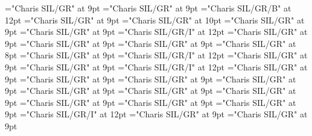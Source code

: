 \documentclass[gps1,twoside]{article}
\begin{document}
\font\spanspansensecontentspansensessensesensesentrybefore="Charis SIL/GR" at 9pt
\font\sensessensesensesentryafter="Charis SIL/GR" at 9pt
\font\sensenumbersensecontentsensessensesensesentry="Charis SIL/GR/B" at 12pt
\font\sensenumbersensecontentsensessensesensesentryafter="Charis SIL/GR" at 9pt
\font\sensesensessensesensesentry="Charis SIL/GR" at 10pt
\font\sensetypesensesensessensesensesentrybefore="Charis SIL/GR" at 9pt
\font\sensetypesensesensessensesensesentryafter="Charis SIL/GR" at 9pt
\font\sensetypesensesensessensesensesentry="Charis SIL/GR/I" at 12pt
\font\spanspanabbreviationsensetypesensesensessensesensesentrybefore="Charis SIL/GR" at 9pt
\font\spanspandefinitionorglosssensesensessensesensesentrybefore="Charis SIL/GR" at 9pt
\font\spandefinitionorglosssensesensessensesensesentrylastchildafter="Charis SIL/GR" at 9pt
\font\exampleexampleexamplessensesensessensesensesentrybefore="Charis SIL/GR" at 8pt
\font\examplessensesensessensesensesentryafter="Charis SIL/GR" at 9pt
\font\spanbzhexampleexampleexamplessensesensessensesensesentry="Charis SIL/GR/I" at 12pt
\font\spanspanexampleexampleexamplessensesensessensesensesentrybefore="Charis SIL/GR" at 9pt
\font\spanexampleexampleexamplessensesensessensesensesentrylastchildafter="Charis SIL/GR" at 9pt
\font\spanexampleexampleexamplessensesensessensesensesentry="Charis SIL/GR/I" at 12pt
\font\spanspantranslationtranslationtranslationsexampleexamplessensesensessensesensesentrybefore="Charis SIL/GR" at 9pt
\font\spantranslationtranslationtranslationsexampleexamplessensesensessensesensesentrylastchildafter="Charis SIL/GR" at 9pt
\font\spanspanencyclopedicinfosensesensessensesensesentrybefore="Charis SIL/GR" at 9pt
\font\spanencyclopedicinfosensesensessensesensesentryfirstchildbefore="Charis SIL/GR" at 9pt
\font\spanencyclopedicinfosensesensessensesensesentrylastchildafter="Charis SIL/GR" at 9pt
\font\spanspanrestrictionssensesensessensesensesentrybefore="Charis SIL/GR" at 9pt
\font\spanrestrictionssensesensessensesensesentryfirstchildbefore="Charis SIL/GR" at 9pt
\font\spanrestrictionssensesensessensesensesentrylastchildafter="Charis SIL/GR" at 9pt
\font\spanspanlexsensereferencessensesensessensesensesentrybefore="Charis SIL/GR" at 9pt
\font\lexsensereferencessensesensessensesensesentryafter="Charis SIL/GR" at 9pt
\font\spanenownertypeabbreviationlexsensereferencelexsensereferencessensesensessensesensesentry="Charis SIL/GR/I" at 12pt
\font\spanspanownertypeabbreviationlexsensereferencelexsensereferencessensesensessensesensesentrybefore="Charis SIL/GR" at 9pt
\font\spanownertypeabbreviationlexsensereferencelexsensereferencessensesensessensesensesentrylastchildafter="Charis SIL/GR" at 9pt
\end{document}
